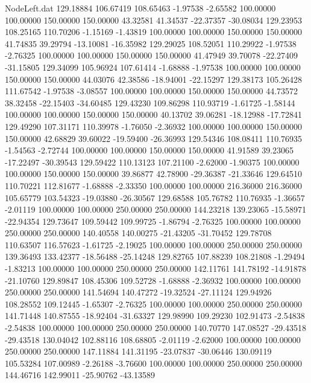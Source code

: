 \begin{filecontents}{NodeLeft.dat}
 129.18884  106.67419  108.65463    -1.97538   -2.65582  100.00000  100.00000  150.00000  150.00000   43.32581   41.34537  -22.37357  -30.08034
 129.23953  108.25165  110.70206    -1.15169   -1.43819  100.00000  100.00000  150.00000  150.00000   41.74835   39.29794  -13.10081  -16.35982
 129.29025  108.52051  110.29922    -1.97538   -2.76325  100.00000  100.00000  150.00000  150.00000   41.47949   39.70078  -22.27409  -31.15805
 129.34099  105.96924  107.61414    -1.68888   -1.97538  100.00000  100.00000  150.00000  150.00000   44.03076   42.38586  -18.94001  -22.15297
 129.38173  105.26428  111.67542    -1.97538   -3.08557  100.00000  100.00000  150.00000  150.00000   44.73572   38.32458  -22.15403  -34.60485
 129.43230  109.86298  110.93719    -1.61725   -1.58144  100.00000  100.00000  150.00000  150.00000   40.13702   39.06281  -18.12988  -17.72841
 129.49290  107.31171  110.39978    -1.76050   -2.36932  100.00000  100.00000  150.00000  150.00000   42.68829   39.60022  -19.59400  -26.36993
 129.54346  108.08411  110.76935    -1.54563   -2.72744  100.00000  100.00000  150.00000  150.00000   41.91589   39.23065  -17.22497  -30.39543
 129.59422  110.13123  107.21100    -2.62000   -1.90375  100.00000  100.00000  150.00000  150.00000   39.86877   42.78900  -29.36387  -21.33646
 129.64510  110.70221  112.81677    -1.68888   -2.33350  100.00000  100.00000  216.36000  216.36000  105.65779  103.54323  -19.03880  -26.30567
 129.68588  105.76782  110.76935    -1.36657   -2.01119  100.00000  100.00000  250.00000  250.00000  144.23218  139.23065  -15.58971  -22.94354
 129.73647  109.59442  109.99725    -1.86794   -2.76325  100.00000  100.00000  250.00000  250.00000  140.40558  140.00275  -21.43205  -31.70452
 129.78708  110.63507  116.57623    -1.61725   -2.19025  100.00000  100.00000  250.00000  250.00000  139.36493  133.42377  -18.56488  -25.14248
 129.82765  107.88239  108.21808    -1.29494   -1.83213  100.00000  100.00000  250.00000  250.00000  142.11761  141.78192  -14.91878  -21.10760
 129.89847  108.45306  109.52728    -1.68888   -2.36932  100.00000  100.00000  250.00000  250.00000  141.54694  140.47272  -19.32524  -27.11124
 129.94926  108.28552  109.12445    -1.65307   -2.76325  100.00000  100.00000  250.00000  250.00000  141.71448  140.87555  -18.92404  -31.63327
 129.98990  109.29230  102.91473    -2.54838   -2.54838  100.00000  100.00000  250.00000  250.00000  140.70770  147.08527  -29.43518  -29.43518
 130.04042  102.88116  108.68805    -2.01119   -2.62000  100.00000  100.00000  250.00000  250.00000  147.11884  141.31195  -23.07837  -30.06446
 130.09119  105.53284  107.00989    -2.26188   -3.76600  100.00000  100.00000  250.00000  250.00000  144.46716  142.99011  -25.90762  -43.13589

\end{filecontents}
